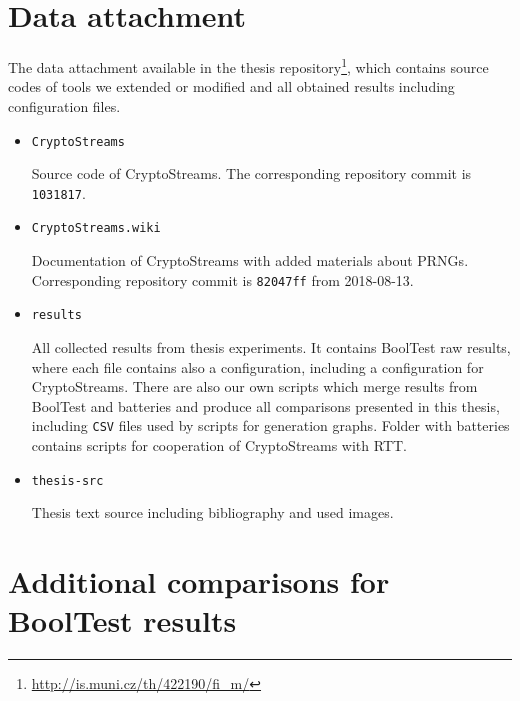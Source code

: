 \documentclass[
    digital,    %
    oneside,    %
    color,
    11pt,
    nocover,
    notable,
    nolof,
    nolot,
    final
]{fithesis3}
\renewcommand\_{\textunderscore\allowbreak}
\begin{document}
\setcounter{biburllcpenalty}{7000}
\setcounter{biburlucpenalty}{8000}
\printbibliography[heading=bibintoc] %

\appendix{}

\chapter{Data attachment}

The data attachment available in the thesis repository\footnote{\url{http://is.muni.cz/th/422190/fi_m/}}, which contains source codes of tools we extended or modified and all obtained results including configuration files.

\begin{itemize}
	\item \texttt{CryptoStreams}
	
	Source code of CryptoStreams. The corresponding repository commit is \texttt{1031817}.
	
	\item \texttt{CryptoStreams.wiki}
	
	Documentation of CryptoStreams with added materials about PRNGs. Corresponding repository commit is \texttt{82047ff} from 2018-08-13.
	
	
	
	\item \texttt{results}
	
	All collected results from thesis experiments. It contains BoolTest raw results, where each file contains also a configuration, including a configuration for CryptoStreams. There are also our own scripts which merge results from BoolTest and batteries and produce all comparisons presented in this thesis, including \texttt{CSV} files used by scripts for generation graphs. Folder with batteries contains scripts for cooperation of CryptoStreams with RTT.
	
	
	\item \texttt{thesis-src}
	
	Thesis text source including bibliography and used images.
\end{itemize}

\chapter{Additional comparisons for BoolTest results}
\end{document}
